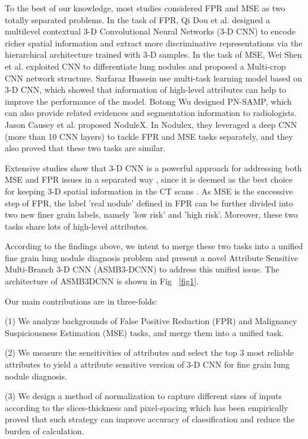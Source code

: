 \documentclass{article}
\begin{document}
To the best of our knowledge, most studies considered FPR and MSE as two totally separated problems.
In the task of FPR, Qi Dou et al. \cite{Qi2016Multilevel} designed a multilevel contextual 3-D Convolutional Neural Networks (3-D CNN) to encode richer spatial information and extract more discriminative representations via the hierarchical architecture trained with 3-D samples.
In the task of MSE, Wei Shen et al. \cite{Shen2017Multi} exploited CNN to differentiate lung nodules and proposed a Multi-crop CNN network structure. Sarfaraz Hussein \cite{Hussein2017Risk} use multi-task learning model based on 3-D CNN, which showed that information of high-level attributes can help to improve the performance of the model. Botong Wu\cite{Wu2018Joint} designed PN-SAMP, which can also provide related evidences and segmentation information to radiologists.
Jason Causey et al.\cite{Causey2018Highly} proposed NoduleX. In Nodulex, they leveraged a deep CNN (more than 10 CNN layers) to tackle FPR and MSE tasks separately, and they also proved that these two tasks are similar.

Extensive studies show that 3-D CNN is a powerful approach for addressing both MSE and FPR issues in a separated way \cite{Qi2016Multilevel}\cite{Causey2018Highly}\cite{Shen2015Multi}\cite{Kang20173D}, since it is deemed as the best choice for keeping 3-D spatial information in the CT scans \cite{Yorozu1987Electron}. As MSE is the successive step of FPR, the label 'real nodule' defined in FPR can be further divided into two new finer grain labels, namely 'low risk' and 'high risk'. Moreover, these two tasks share lots of high-level attributes.

According to the findings above, we intent to merge these two tasks into a unified fine grain lung nodule diagnosis problem and present a novel Attribute Sensitive Multi-Branch 3-D CNN (ASMB3-DCNN) to address this unified issue. The architecture of ASMB3DCNN is shown in Fig ~\ref{fig1}.


Our main contributions are in three-folds:

(1) We analyze backgrounds of False Positive Reduction (FPR) and  Malignancy Suspiciousness Estimation (MSE) tasks, and merge them into a unified task.

(2) We measure the sensitivities of attributes and select the top 3 most reliable attributes to yield a attribute sensitive version of 3-D CNN for fine grain lung nodule diagnosis.

(3) We design a method of normalization to capture different sizes of inputs according to the slices-thickness and pixel-spacing which has been empirically proved that such strategy can improve accuracy of classification and reduce the burden of calculation.
\end{document}
